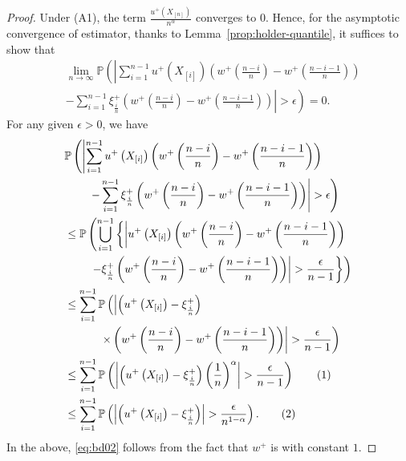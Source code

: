 \begin{proof}
Under (A1), the term $\frac{u^+\left(X_{[n]}\right)}{n^\alpha}$ converges to 0.
Hence,
 for the asymptotic convergence of estimator,
 thanks to Lemma~\ref{prop:holder-quantile}, it suffices to show that
\begin{align*}
& \lim_{n\rightarrow \infty} \mathbb{P} \left( \left| \sum_{i=1}^{n-1} u^+\left(X_{[i]}\right) \left(w^+\left(\frac{n-i}{n} \right)  - w^+\left(\frac{n-i-1}{n} \right) \right) \right.\right. \\
&\left.\left.-\sum_{i=1}^{n-1} \xi^+_{\frac{i}{n}} \left(w^+\left(\frac{n-i}{n} \right)  - w^+\left(\frac{n-i-1}{n} \right) \right)\right| >
\epsilon \right)=0.
\end{align*}
For any given $\epsilon>0$, we have 
\begin{align*}
& \mathbb{P} \left( \left| \sum_{i=1}^{n-1} u^+\left(X_{[i]}\right)  \left(w^+\left(\frac{n-i}{n} \right)  - w^+\left(\frac{n-i-1}{n} \right) \right) \right.\right. \\
&\qquad\left.\left.-\sum_{i=1}^{n-1} \xi^+_{\frac{i}{n}}  \left(w^+\left(\frac{n-i}{n} \right)  - w^+\left(\frac{n-i-1}{n} \right) \right) \right| >
\epsilon\right) \\ 
& \leq \mathbb{P}\left( \bigcup _{i=1}^{n-1} \left\{ \left| u^+\left(X_{[i]}\right) \left(w^+\left(\frac{n-i}{n}\right) -
w^+\left(\frac{n-i-1}{n}\right)\right)\right.\right.\right.\\
&\qquad\left.\left.\left.- \xi^+_{\frac{i}{n}}  \left(w^+\left(\frac{n-i}{n} \right)  - w^+\left(\frac{n-i-1}{n} \right) \right)
\right| > \frac{\epsilon}{n-1} \right\}\right) \\ 
& \leq \sum _{i=1}^{n-1} \mathbb{P}\left( \left| \left( u^+\left(X_{[i]}\right) -
\xi^+_{\frac{i}{n}}\right)\right.\right. \\
&\quad\qquad\left.\left.\times\left(w^+\left(\frac{n-i}{n} \right)  - w^+\left(\frac{n-i-1}{n} \right) \right) \right| > \frac{\epsilon}{n-1}\right)
\\ 
& \leq \sum _{i=1}^{n-1} \Prob{ \left| \left( u^+\left(X_{[i]}\right) - \xi^+_{\frac{i}{n}}\right) \left(\frac{1}{n}\right)^{\alpha}
\right| > \frac{\epsilon}{n-1}} \stepcounter{equation}\tag{\theequation}\label{eq:bd02}\\ 
& \le \sum _{i=1}^{n-1} \Prob{ \left| \left( u^+\left(X_{[i]}\right) - \xi^+_{\frac{i}{n}}\right)
\right| > \frac{\epsilon}{n^{1-\alpha}}}.\stepcounter{equation}\tag{\theequation}\label{eq:bd12}
\end{align*}
In the above, \eqref{eq:bd02} follows from the fact that $w^+$ is \holder with constant $1$.


\end{proof}
